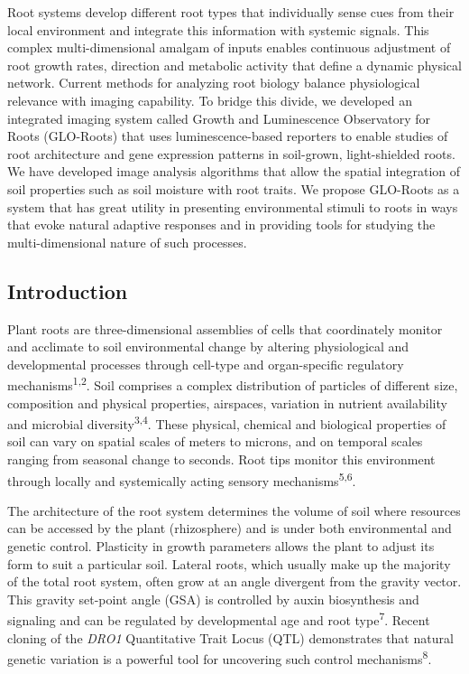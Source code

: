 \documentclass[]{article}
\begin{document}
Root systems develop different root types that individually sense cues
from their local environment and integrate this information with
systemic signals. This complex multi-dimensional amalgam of inputs
enables continuous adjustment of root growth rates, direction and
metabolic activity that define a dynamic physical network. Current
methods for analyzing root biology balance physiological relevance with
imaging capability. To bridge this divide, we developed an integrated
imaging system called Growth and Luminescence Observatory for Roots
(GLO-Roots) that uses luminescence-based reporters to enable studies of
root architecture and gene expression patterns in soil-grown,
light-shielded roots. We have developed image analysis algorithms that
allow the spatial integration of soil properties such as soil moisture
with root traits. We propose GLO-Roots as a system that has great
utility in presenting environmental stimuli to roots in ways that evoke
natural adaptive responses and in providing tools for studying the
multi-dimensional nature of such processes.

\subsection{Introduction}\label{introduction}

Plant roots are three-dimensional assemblies of cells that coordinately
monitor and acclimate to soil environmental change by altering
physiological and developmental processes through cell-type and
organ-specific regulatory mechanisms\textsuperscript{1,2}. Soil
comprises a complex distribution of particles of different size,
composition and physical properties, airspaces, variation in nutrient
availability and microbial diversity\textsuperscript{3,4}. These
physical, chemical and biological properties of soil can vary on spatial
scales of meters to microns, and on temporal scales ranging from
seasonal change to seconds. Root tips monitor this environment through
locally and systemically acting sensory mechanisms\textsuperscript{5,6}.

The architecture of the root system determines the volume of soil where
resources can be accessed by the plant (rhizosphere) and is under both
environmental and genetic control. Plasticity in growth parameters
allows the plant to adjust its form to suit a particular soil. Lateral
roots, which usually make up the majority of the total root system,
often grow at an angle divergent from the gravity vector. This gravity
set-point angle (GSA) is controlled by auxin biosynthesis and signaling
and can be regulated by developmental age and root
type\textsuperscript{7}. Recent cloning of the \emph{DRO1} Quantitative
Trait Locus (QTL) demonstrates that natural genetic variation is a
powerful tool for uncovering such control mechanisms\textsuperscript{8}.
\end{document}
